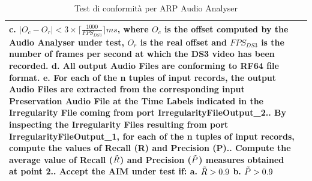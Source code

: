 \begin{spacing}{1.1}
\begin{table}[H]
\begin{tabular}{|p{}|p{}|}
            	   c.	$|O_c - O_r| < 3 \times \lceil\frac{1000}{FPS_{DS3}}\rceil ms$, where $O_c$ is the offset computed by the Audio Analyser under test, $O_r$ is the real offset and $FPS_{DS3}$ is the number of frames per second at which the DS3 video has been recorded.\newline
            	   d.	All output Audio Files are conforming to RF64 file format.\newline
            	   e.	For each of the n tuples of input records, the output Audio Files are extracted from the corresponding input Preservation Audio File at the Time Labels indicated in the Irregularity File coming from port IrregularityFileOutput\_2.\newline
            	2.	By inspecting the Irregularity Files resulting from port IrregularityFileOutput\_1, for each of the n tuples of input records, compute the values of Recall (R) and Precision (P).\newline
            	3.	Compute the average value of Recall ($\Tilde{R}$) and Precision ($\Tilde{P}$) measures obtained at point 2.\newline
            	4.	Accept the AIM under test if:\newline
                	a.	$\Tilde{R} > 0.9$\newline
                	b.	$\Tilde{P} > 0.9$\\
        \hline
    \end{tabular}
    \caption{Test di conformità per \ac{ARP} Audio Analyser}
    \label{tab:audioanalyser-valutazione}
\end{table}


\end{spacing}
